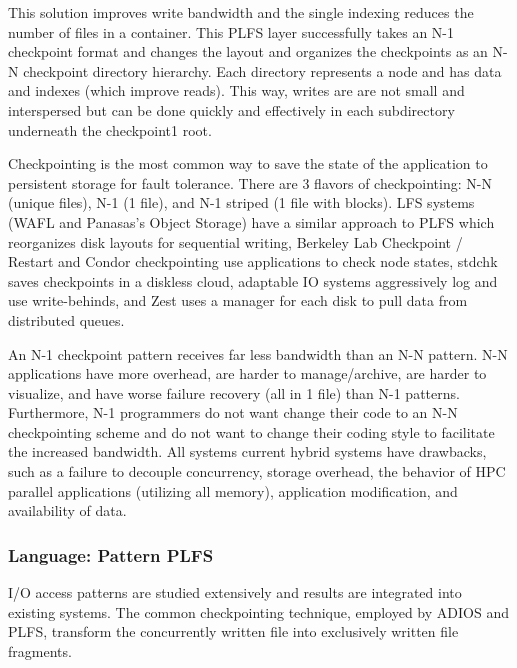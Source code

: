 This solution improves write bandwidth and the single indexing reduces the
number of files in a container. This PLFS layer successfully takes an N-1
checkpoint format and changes the layout and organizes the checkpoints as an
N-N checkpoint directory hierarchy. Each directory represents a node and has
data and indexes (which improve reads). This way, writes are are not small and
interspersed but can be done quickly and effectively in each subdirectory
underneath the checkpoint1 root.

Checkpointing is the most common way to save the state of the application to
persistent storage for fault tolerance. There are 3 flavors of checkpointing:
N-N (unique files), N-1 (1 file), and N-1 striped (1 file with blocks). LFS
systems (WAFL and Panasas's Object Storage) have a similar approach to PLFS
which reorganizes disk layouts for sequential writing, Berkeley Lab Checkpoint
/ Restart and Condor checkpointing use applications to check node states,
stdchk saves checkpoints in a  diskless cloud, adaptable IO systems
aggressively log and use write-behinds, and Zest uses a manager for each disk
to pull data from distributed queues.

An N-1 checkpoint pattern receives far less bandwidth than an N-N pattern. N-N
applications have more overhead, are harder to manage/archive, are harder to
visualize, and have worse failure recovery (all in 1 file) than N-1 patterns.
Furthermore, N-1 programmers do not want change their code to an N-N
checkpointing scheme and do not want to change their coding style to facilitate
the increased bandwidth. All systems current hybrid systems have drawbacks,
such as a failure to decouple concurrency, storage overhead, the behavior of
HPC parallel applications (utilizing all memory), application modification, and
availability of data.

\subsubsection{Language: Pattern PLFS}
\label{sec:language-patterned-io}

I/O access patterns are studied extensively and results are integrated into
existing systems. The common checkpointing technique, employed by ADIOS and
PLFS, transform the concurrently written file into exclusively written file
fragments. 

